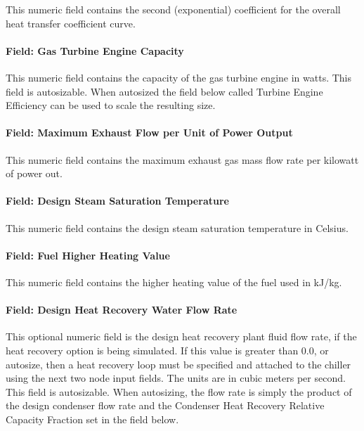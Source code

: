 This numeric field contains the second (exponential) coefficient for the overall heat transfer coefficient curve.

\paragraph{Field: Gas Turbine Engine Capacity}\label{field-gas-turbine-engine-capacity}

This numeric field contains the capacity of the gas turbine engine in watts. This field is autosizable. When autosized the field below called Turbine Engine Efficiency can be used to scale the resulting size.

\paragraph{Field: Maximum Exhaust Flow per Unit of Power Output}\label{field-maximum-exhaust-flow-per-unit-of-power-output-1-000}

This numeric field contains the maximum exhaust gas mass flow rate per kilowatt of power out.

\paragraph{Field: Design Steam Saturation Temperature}\label{field-design-steam-saturation-temperature}

This numeric field contains the design steam saturation temperature in Celsius.

\paragraph{Field: Fuel Higher Heating Value}\label{field-fuel-higher-heating-value-1-000}

This numeric field contains the higher heating value of the fuel used in kJ/kg.

\paragraph{Field: Design Heat Recovery Water Flow Rate}\label{field-design-heat-recovery-water-flow-rate-4}

This optional numeric field is the design heat recovery plant fluid flow rate, if the heat recovery option is being simulated. If this value is greater than 0.0, or autosize, then a heat recovery loop must be specified and attached to the chiller using the next two node input fields. The units are in cubic meters per second. This field is autosizable. When autosizing, the flow rate is simply the product of the design condenser flow rate and the Condenser Heat Recovery Relative Capacity Fraction set in the field below.

